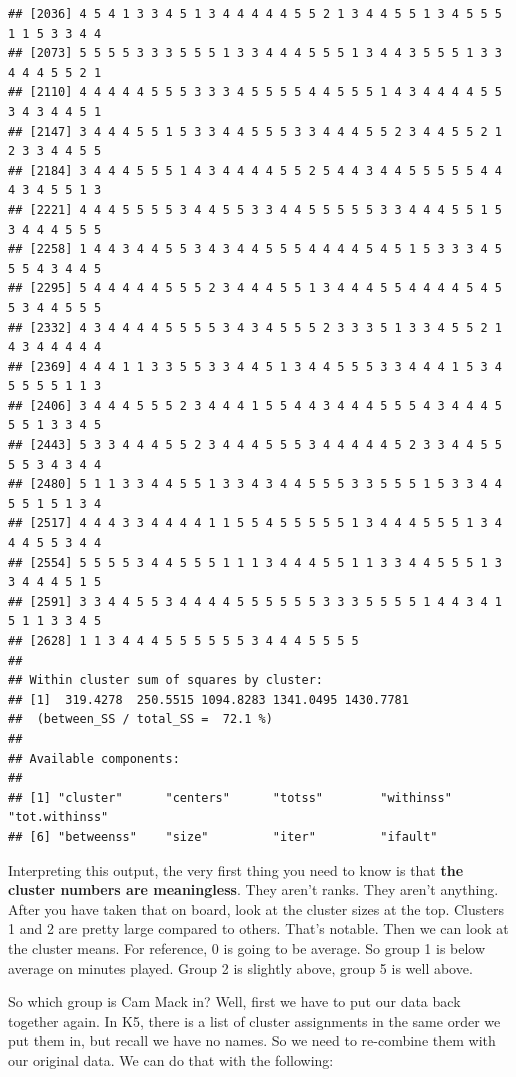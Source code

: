 \documentclass[
]{book}
\begin{document}
\begin{verbatim}
## [2036] 4 5 4 1 3 3 4 5 1 3 4 4 4 4 4 5 5 2 1 3 4 4 5 5 1 3 4 5 5 5 1 1 5 3 3 4 4
## [2073] 5 5 5 5 3 3 3 5 5 5 1 3 3 4 4 4 5 5 5 1 3 4 4 3 5 5 5 1 3 3 4 4 4 5 5 2 1
## [2110] 4 4 4 4 4 5 5 5 3 3 3 4 5 5 5 5 4 4 5 5 5 1 4 3 4 4 4 4 5 5 3 4 3 4 4 5 1
## [2147] 3 4 4 4 5 5 1 5 3 3 4 4 5 5 5 3 3 4 4 4 5 5 2 3 4 4 5 5 2 1 2 3 3 4 4 5 5
## [2184] 3 4 4 4 5 5 5 1 4 3 4 4 4 4 5 5 2 5 4 4 3 4 4 5 5 5 5 5 4 4 4 3 4 5 5 1 3
## [2221] 4 4 4 5 5 5 5 3 4 4 5 5 3 3 4 4 5 5 5 5 5 3 3 4 4 4 5 5 1 5 3 4 4 4 5 5 5
## [2258] 1 4 4 3 4 4 5 5 3 4 3 4 4 5 5 5 4 4 4 4 5 4 5 1 5 3 3 3 4 5 5 5 4 3 4 4 5
## [2295] 5 4 4 4 4 4 5 5 5 2 3 4 4 4 5 5 1 3 4 4 4 5 5 4 4 4 4 5 4 5 5 3 4 4 5 5 5
## [2332] 4 3 4 4 4 4 5 5 5 5 3 4 3 4 5 5 5 2 3 3 3 5 1 3 3 4 5 5 2 1 4 3 4 4 4 4 4
## [2369] 4 4 4 1 1 3 3 5 5 3 3 4 4 5 1 3 4 4 5 5 5 3 3 4 4 4 1 5 3 4 5 5 5 5 1 1 3
## [2406] 3 4 4 4 5 5 5 2 3 4 4 4 1 5 5 4 4 3 4 4 4 5 5 5 4 3 4 4 4 5 5 5 1 3 3 4 5
## [2443] 5 3 3 4 4 4 5 5 2 3 4 4 4 5 5 5 3 4 4 4 4 4 5 2 3 3 4 4 5 5 5 5 3 4 3 4 4
## [2480] 5 1 1 3 3 4 4 5 5 1 3 3 4 3 4 4 5 5 5 3 3 5 5 5 1 5 3 3 4 4 5 5 1 5 1 3 4
## [2517] 4 4 4 3 3 4 4 4 4 1 1 5 5 4 5 5 5 5 5 1 3 4 4 4 5 5 5 1 3 4 4 4 5 5 3 4 4
## [2554] 5 5 5 5 3 4 4 5 5 5 1 1 1 3 4 4 4 5 5 1 1 3 3 4 4 5 5 5 1 3 3 4 4 4 5 1 5
## [2591] 3 3 4 4 5 5 3 4 4 4 4 5 5 5 5 5 5 3 3 3 5 5 5 5 1 4 4 3 4 1 5 1 1 3 3 4 5
## [2628] 1 1 3 4 4 4 5 5 5 5 5 5 3 4 4 4 5 5 5 5
## 
## Within cluster sum of squares by cluster:
## [1]  319.4278  250.5515 1094.8283 1341.0495 1430.7781
##  (between_SS / total_SS =  72.1 %)
## 
## Available components:
## 
## [1] "cluster"      "centers"      "totss"        "withinss"     "tot.withinss"
## [6] "betweenss"    "size"         "iter"         "ifault"
\end{verbatim}

Interpreting this output, the very first thing you need to know is that \textbf{the cluster numbers are meaningless}. They aren't ranks. They aren't anything. After you have taken that on board, look at the cluster sizes at the top. Clusters 1 and 2 are pretty large compared to others. That's notable. Then we can look at the cluster means. For reference, 0 is going to be average. So group 1 is below average on minutes played. Group 2 is slightly above, group 5 is well above.

So which group is Cam Mack in? Well, first we have to put our data back together again. In K5, there is a list of cluster assignments in the same order we put them in, but recall we have no names. So we need to re-combine them with our original data. We can do that with the following:
\end{document}
